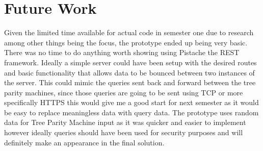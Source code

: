 \section{Future Work}
Given the limited time available for actual code in semester one due to research among other things being the focus, the prototype ended up being very basic. There was no time to do anything worth showing using Pistache the REST framework. Ideally a simple server could have been setup with the desired routes and basic functionality that allows data to be bounced between two instances of the server. This could mimic the queries sent back and forward between the tree parity machines, since those queries are going to be sent using TCP or more specifically HTTPS this would give me a good start for next semester as it would be easy to replace meaningless data with query data.
The prototype uses random data for Tree Parity Machine input as it was quicker and easier to implement however ideally queries should have been used for security purposes and will definitely make an appearance in the final solution.



